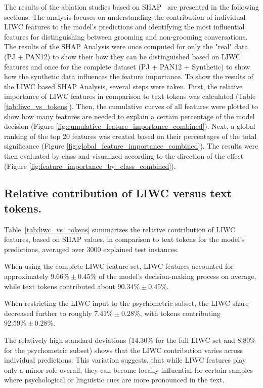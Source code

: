 The results of the ablation studies based on SHAP~\cite{lundberg2017shap} are presented in the following sections. The analysis focuses on understanding the contribution of individual LIWC features to the model's predictions and identifying the most influential features for distinguishing between grooming and non-grooming conversations. The results of the SHAP Analysis were once computed for only the "real" data (PJ + PAN12) to show their how they can be distinguished based on LIWC features and once for the complete dataset (PJ + PAN12 + Synthetic) to show how the synthetic data influences the feature importance. To show the results of the LIWC based SHAP Analysis, several steps were taken. First, the relative importance of LIWC features in comparison to text tokens was calculated (Table \ref{tab:liwc_vs_tokens}). Then, the cumulative curves of all features were plotted to show how many features are needed to explain a certain percentage of the model decision (Figure \ref{fig:cumulative_feature_importance_combined}). Next, a global ranking of the top 20 features was created based on their percentages of the total significance (Figure \ref{fig:global_feature_importance_combined}). The results were then evaluated by class and visualized according to the direction of the effect (Figure \ref{fig:feature_importance_by_class_combined}).

\subsection{Relative contribution of LIWC versus text tokens.}
Table~\ref{tab:liwc_vs_tokens} summarizes the relative contribution of LIWC features, based on SHAP values, in comparison to text tokens for the model’s predictions, averaged over 3000 explained test instances.  

When using the complete LIWC feature set, LIWC features accounted for approximately $9.66\% \pm 0.45\%$ of the model’s decision-making process on average, while text tokens contributed about $90.34\% \pm 0.45\%$.  

When restricting the LIWC input to the psychometric subset, the LIWC share decreased further to roughly $7.41\% \pm 0.28\%$, with tokens contributing $92.59\% \pm 0.28\%$.  

The relatively high standard deviations (14.30\% for the full LIWC set and 8.80\% for the psychometric subset) shows that the LIWC contribution varies across individual predictions. This variation suggests, that while LIWC features play only a minor role overall, they can become locally influential for certain samples where psychological or linguistic cues are more pronounced in the text.

